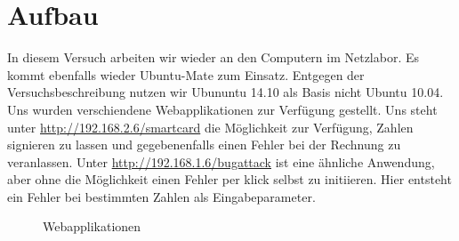 \documentclass{article}
\begin{document}
\section{Aufbau}
In diesem Versuch arbeiten wir wieder an den Computern im Netzlabor. Es kommt ebenfalls wieder Ubuntu-Mate zum Einsatz. Entgegen der Versuchsbeschreibung nutzen wir Ubununtu 14.10 als Basis nicht Ubuntu 10.04. Uns wurden verschiendene Webapplikationen zur Verfügung gestellt. Uns steht unter \href{http://192.168.2.6/smartcard}{http://192.168.2.6/smartcard} die Möglichkeit zur Verfügung, Zahlen signieren zu lassen und gegebenenfalls einen Fehler bei der Rechnung zu veranlassen. Unter \href{http://192.168.1.6/bugattack}{http://192.168.1.6/bugattack} ist eine ähnliche Anwendung, aber ohne die Möglichkeit einen Fehler per klick selbst zu initiieren. Hier entsteht ein Fehler bei bestimmten Zahlen als Eingabeparameter.
\begin{figure}[H]
  \centering
  \qquad
  \caption{Webapplikationen}
  \label{fig:1}
\end{figure}
\newpage %
\end{document}
